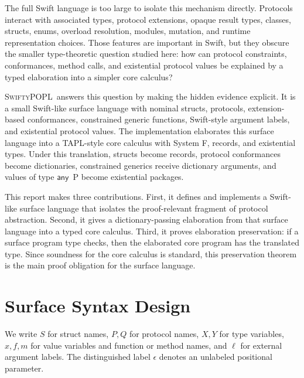 \documentclass[manuscript,nonacm]{acmart}
\newcommand{\lang}{\textsc{SwiftyPOPL}}
\newcommand{\kw}[1]{\ensuremath{\mathsf{#1}}}
\newcommand{\Any}[1]{\kw{any}\ #1}
\begin{document}
The full Swift language is too large to isolate this mechanism directly.
Protocols interact with associated types, protocol extensions, opaque result types, classes, structs, enums, overload resolution, modules, mutation, and runtime representation choices.
Those features are important in Swift, but they obscure the smaller type-theoretic question studied here:
how can protocol constraints, conformances, method calls, and existential protocol values be explained by a typed elaboration into a simpler core calculus?

\lang\ answers this question by making the hidden evidence explicit.
It is a small Swift-like surface language with nominal structs, protocols, extension-based conformances, constrained generic functions, Swift-style argument labels, and existential protocol values.
The implementation elaborates this surface language into a TAPL-style core calculus with System F, records, and existential types.
Under this translation, structs become records, protocol conformances become dictionaries, constrained generics receive dictionary arguments, and values of type \Any{P} become existential packages.

This report makes three contributions.
First, it defines and implements a Swift-like surface language that isolates the proof-relevant fragment of protocol abstraction.
Second, it gives a dictionary-passing elaboration from that surface language into a typed core calculus.
Third, it proves elaboration preservation:
if a surface program type checks, then the elaborated core program has the translated type.
Since soundness for the core calculus is standard, this preservation theorem is the main proof obligation for the surface language.

\section{Surface Syntax Design}

We write $S$ for struct names, $P,Q$ for protocol names, $X,Y$ for type variables, $x,f,m$ for value variables and function or method names, and $\ell$ for external argument labels.
The distinguished label $\epsilon$ denotes an unlabeled positional parameter.
\end{document}
